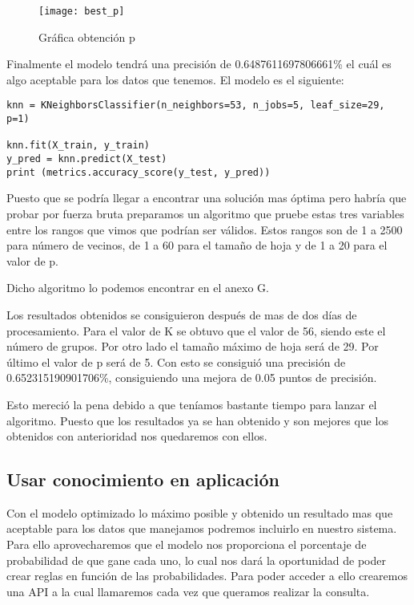 \begin{figure}[htb]
  \centering
    \texttt{[image: best\_p]}
  \caption[Gráfica obtención p]{Gráfica obtención p}
  \label{fig:Gráfica obtención p}
\end{figure}



Finalmente el modelo tendrá una precisión de 0.6487611697806661\% el cuál es algo
aceptable para los datos que tenemos. El modelo es el siguiente:

\begin{lstlisting}
knn = KNeighborsClassifier(n_neighbors=53, n_jobs=5, leaf_size=29, p=1)

knn.fit(X_train, y_train)
y_pred = knn.predict(X_test)
print (metrics.accuracy_score(y_test, y_pred))
\end{lstlisting}

Puesto que se podría llegar a encontrar una solución mas óptima pero habría que probar
por fuerza bruta preparamos un algoritmo que pruebe estas tres variables entre los rangos
que vimos que podrían ser válidos. Estos rangos son de 1 a 2500 para número de vecinos,
de 1 a 60 para el tamaño de hoja y de 1 a 20 para el valor de p.

Dicho algoritmo lo podemos encontrar en el anexo G.

Los resultados obtenidos se consiguieron después de mas de dos días de procesamiento.
Para el valor de K se obtuvo que el valor de 56, siendo este el número de grupos. Por otro lado
el tamaño máximo de hoja será de 29. Por último el valor de p será de 5. Con esto se consiguió
una precisión de 0.652315190901706\%, consiguiendo una mejora de 0.05 puntos de precisión.

Esto mereció la pena debido a que teníamos bastante tiempo para lanzar el algoritmo. Puesto que
los resultados ya se han obtenido y son mejores que los obtenidos con anterioridad nos
quedaremos con ellos.

\subsection{Usar conocimiento en aplicación}

Con el modelo optimizado lo máximo posible y obtenido un resultado mas que aceptable
para los datos que manejamos podremos incluirlo en nuestro sistema. Para ello aprovecharemos
que el modelo nos proporciona el porcentaje de probabilidad de que gane cada uno, lo cual nos
dará la oportunidad de poder crear reglas en función de las probabilidades. Para poder acceder
a ello crearemos una API a la cual llamaremos cada vez que queramos realizar la consulta.

